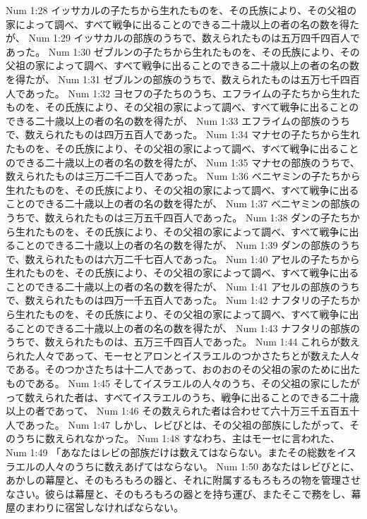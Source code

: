 Num 1:28  イッサカルの子たちから生れたものを、その氏族により、その父祖の家によって調べ、すべて戦争に出ることのできる二十歳以上の者の名の数を得たが、
Num 1:29  イッサカルの部族のうちで、数えられたものは五万四千四百人であった。
Num 1:30  ゼブルンの子たちから生れたものを、その氏族により、その父祖の家によって調べ、すべて戦争に出ることのできる二十歳以上の者の名の数を得たが、
Num 1:31  ゼブルンの部族のうちで、数えられたものは五万七千四百人であった。
Num 1:32  ヨセフの子たちのうち、エフライムの子たちから生れたものを、その氏族により、その父祖の家によって調べ、すべて戦争に出ることのできる二十歳以上の者の名の数を得たが、
Num 1:33  エフライムの部族のうちで、数えられたものは四万五百人であった。
Num 1:34  マナセの子たちから生れたものを、その氏族により、その父祖の家によって調べ、すべて戦争に出ることのできる二十歳以上の者の名の数を得たが、
Num 1:35  マナセの部族のうちで、数えられたものは三万二千二百人であった。
Num 1:36  ベニヤミンの子たちから生れたものを、その氏族により、その父祖の家によって調べ、すべて戦争に出ることのできる二十歳以上の者の名の数を得たが、
Num 1:37  ベニヤミンの部族のうちで、数えられたものは三万五千四百人であった。
Num 1:38  ダンの子たちから生れたものを、その氏族により、その父祖の家によって調べ、すべて戦争に出ることのできる二十歳以上の者の名の数を得たが、
Num 1:39  ダンの部族のうちで、数えられたものは六万二千七百人であった。
Num 1:40  アセルの子たちから生れたものを、その氏族により、その父祖の家によって調べ、すべて戦争に出ることのできる二十歳以上の者の名の数を得たが、
Num 1:41  アセルの部族のうちで、数えられたものは四万一千五百人であった。
Num 1:42  ナフタリの子たちから生れたものを、その氏族により、その父祖の家によって調べ、すべて戦争に出ることのできる二十歳以上の者の名の数を得たが、
Num 1:43  ナフタリの部族のうちで、数えられたものは、五万三千四百人であった。
Num 1:44  これらが数えられた人々であって、モーセとアロンとイスラエルのつかさたちとが数えた人々である。そのつかさたちは十二人であって、おのおのその父祖の家のために出たものである。
Num 1:45  そしてイスラエルの人々のうち、その父祖の家にしたがって数えられた者は、すべてイスラエルのうち、戦争に出ることのできる二十歳以上の者であって、
Num 1:46  その数えられた者は合わせて六十万三千五百五十人であった。
Num 1:47  しかし、レビびとは、その父祖の部族にしたがって、そのうちに数えられなかった。
Num 1:48  すなわち、主はモーセに言われた、
Num 1:49  「あなたはレビの部族だけは数えてはならない。またその総数をイスラエルの人々のうちに数えあげてはならない。
Num 1:50  あなたはレビびとに、あかしの幕屋と、そのもろもろの器と、それに附属するもろもろの物を管理させなさい。彼らは幕屋と、そのもろもろの器とを持ち運び、またそこで務をし、幕屋のまわりに宿営しなければならない。
